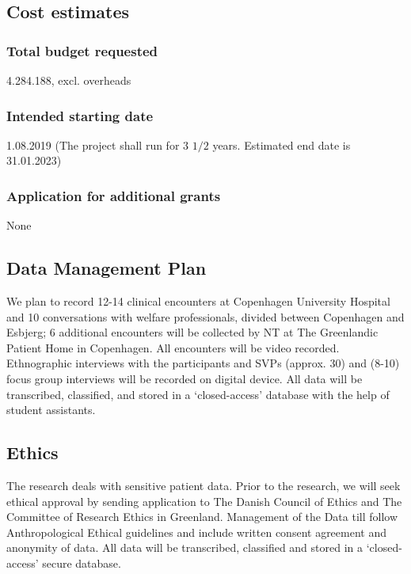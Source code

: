 \documentclass[twocolumn, issue, rga, authordate]{jote-new-article}
\begin{document}
\subsection{Cost estimates}



\subsubsection{Total budget requested}


4.284.188, excl. overheads


\subsubsection{Intended starting date}


1.08.2019 (The project shall run for 3 $1/2$ years. Estimated end date is 31.01.2023)


\subsubsection{Application for additional grants}


None


\subsection{Data Management Plan}


We plan to record 12-14 clinical encounters at Copenhagen University Hospital and 10 conversations with welfare professionals, divided between Copenhagen and Esbjerg; 6 additional encounters will be collected by NT at The Greenlandic Patient Home in Copenhagen. All encounters will be video recorded. Ethnographic interviews with the participants and SVPs (approx. 30) and (8-10) focus group interviews will be recorded on digital device. All data will be transcribed, classified, and stored in a `closed-access' database with the help of student assistants.



\subsection{Ethics}


The research deals with sensitive patient data. Prior to the research, we will seek ethical approval by sending application to The Danish Council of Ethics and The Committee of Research Ethics in Greenland.
Management of the Data till follow Anthropological Ethical guidelines and include written consent agreement and anonymity of data. All data will be transcribed, classified and stored in a `closed-access' secure database.
\end{document}
